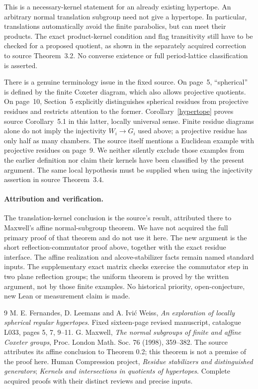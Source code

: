 \documentclass[11pt,a4paper]{article}
\begin{document}
This is a necessary-kernel statement for an already existing hypertope.
An arbitrary normal translation subgroup need not give a hypertope.
In particular, translations automatically avoid the finite parabolics,
but can meet their products. The exact product-kernel condition and
flag transitivity still have to be checked for a proposed quotient, as
shown in the separately acquired correction to source Theorem~3.2.
No converse existence or full period-lattice classification is asserted.

There is a genuine terminology issue in the fixed source. On page~5,
``spherical'' is defined by the finite Coxeter diagram, which also
allows projective quotients. On page~10, Section~5 explicitly distinguishes
spherical residues from projective residues and restricts attention to
the former. Corollary~\ref{hypertope} proves source Corollary~5.1 in
this latter, locally universal sense. Finite residue diagrams alone do
not imply the injectivity $W_i\to G_i$ used above; a projective residue
has only half as many chambers. The source itself mentions a Euclidean
example with projective residues on page~9. We neither silently exclude
those examples from the earlier definition nor claim their kernels have
been classified by the present argument. The same local hypothesis must
be supplied when using the injectivity assertion in source Theorem~3.4.

\paragraph{Attribution and verification.}
The translation-kernel conclusion is the source's result, attributed
there to Maxwell's affine normal-subgroup theorem. We have not acquired
the full primary proof of that theorem and do not use it here. The new
argument is the short reflection-commutator proof above, together with
the exact residue interface. The affine realization and alcove-stabilizer
facts remain named standard inputs. The supplementary exact matrix checks
exercise the commutator step in two plane reflection groups; the uniform
theorem is proved by the written argument, not by those finite examples.
No historical priority, open-conjecture, new Lean or measurement claim is made.

\begin{thebibliography}{9}
 M. E. Fernandes, D. Leemans and A. Ivi\'c Weiss,
\emph{An exploration of locally spherical regular hypertopes}.
Fixed sixteen-page revised manuscript, catalogue L033, pages 5, 7, 9--11.
 G. Maxwell, \emph{The normal subgroups of finite and affine
Coxeter groups}, Proc. London Math. Soc. 76 (1998), 359--382.
The source attributes its affine conclusion to Theorem 0.2; this theorem
is not a premise of the proof here.
 Human Compression project,
\emph{Residue stabilizers and distinguished generators};
\emph{Kernels and intersections in quotients of hypertopes}.
Complete acquired proofs with their distinct reviews and precise inputs.
\end{thebibliography}
\end{document}
